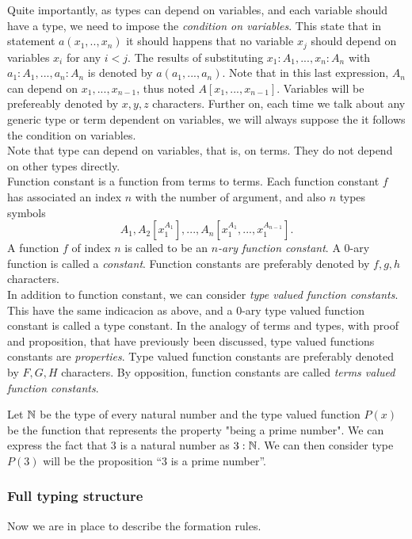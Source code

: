 Quite importantly, as types can depend on variables, and each variable should have a type, we need to impose the \emph{condition on variables}. This state that in statement $a(x_1,..,x_n)$ it should happens that no variable $x_j$ should depend on variables $x_i$ for any $i<j$. The results of substituting $x_1:A_1,...,x_n:A_n$ with $a_1:A_1,...,a_n:A_n$ is denoted by $a(a_1,...,a_n)$. Note that in this last expression, $A_n$ can depend on $x_1,...,x_{n-1}$, thus noted $A[x_1,...,x_{n-1}]$. Variables will be prefereably denoted by $x,y,z$ characters. Further on, each time we talk about any generic type or term dependent on variables, we will always suppose the it follows the condition on variables.\\

Note that type can depend on variables, that is, on terms. They do not depend on other types directly.\\ 

Function constant is a function from terms to terms. Each function constant $f$ has associated an index $n$ with the number of argument, and also $n$ types symbols $$A_1, A_2[x_1^{A_1}],...,A_n[x_1^{A_1},...,x_1^{A_{n-1}}].$$ A function $f$ of index $n$ is called to be an \emph{$n$-ary function constant}. A 0-ary function is called a \emph{constant}.  Function constants are preferably denoted by $f,g,h$ characters. \\

In addition to function constant, we can consider \emph{type valued function constants}. This have the same indicacion as above, and a 0-ary type valued function constant is called a type constant. In the analogy of terms and types, with proof and proposition, that have previously been discussed, type valued functions constants are \emph{properties}. Type valued function constants are preferably denoted by $F,G,H$ characters. By opposition, function constants are called \emph{terms valued function constants}.


\begin{example}\label{example:primeML}
  Let $\mathbb{N}$ be the type of every natural number and the type valued function $P(x)$ be the function that represents the property "being a prime number". We can express the fact that 3 is a natural number as $3: \mathbb{N}$. We can then consider  type $P(3)$ will be the proposition ``3 is a prime number''. 
\end{example}

\subsubsection{Full typing structure}
Now we are in place to describe the formation rules.

